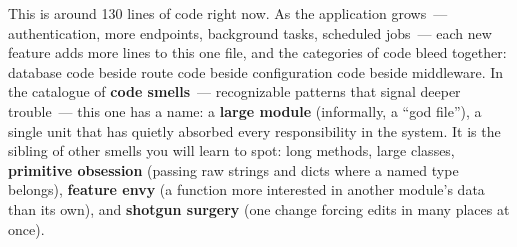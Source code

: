 \begin{codebox}
\begin{Shaded}
\begin{Highlighting}[]
\NormalTok{(}\OperatorTok{=}\NormalTok{[}\NormalTok{])}

\NormalTok{(}\OperatorTok{=}\NormalTok{[}\NormalTok{])}

\NormalTok{(}\OperatorTok{=}\NormalTok{[}\NormalTok{])}

\NormalTok{(}\OperatorTok{=}\NormalTok{[}\NormalTok{])}

  \OperatorTok{==} \NormalTok{:}
\OperatorTok{=}\NormalTok{CONFIG[}\NormalTok{], port}\OperatorTok{=}\NormalTok{CONFIG[}\NormalTok{], debug}\OperatorTok{=}\NormalTok{CONFIG[}\NormalTok{])}
\end{Highlighting}
\end{Shaded}

\end{codebox}

\noindent{}This is around 130 lines of code right now. As the application grows~--- authentication, more endpoints, background tasks, scheduled jobs~--- each new feature adds more lines to this one file, and the categories of code bleed together: database code beside route code beside configuration code beside middleware. In the catalogue of \textbf{code smells}~--- recognizable patterns that signal deeper trouble~--- this one has a name: a \textbf{large module} (informally, a ``god file''), a single unit that has quietly absorbed every responsibility in the system. It is the sibling of other smells you will learn to spot: long methods, large classes, \textbf{primitive obsession} (passing raw strings and dicts where a named type belongs), \textbf{feature envy} (a function more interested in another module's data than its own), and \textbf{shotgun surgery} (one change forcing edits in many places at once).

